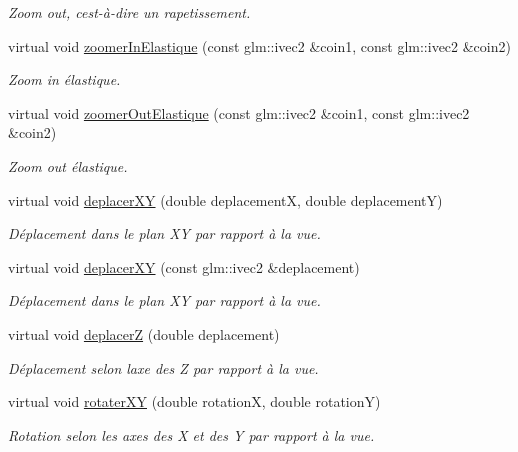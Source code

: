 \begin{DoxyCompactItemize}
\begin{DoxyCompactList}\small\item\em Zoom out, c\textquotesingle{}est-\/à-\/dire un rapetissement. \end{DoxyCompactList}\item 
virtual void \hyperlink{classvue_1_1_vue_ortho_aa8fb0de647e8c534986348f2bd5fe4a6}{zoomer\+In\+Elastique} (const glm\+::ivec2 \&coin1, const glm\+::ivec2 \&coin2)
\begin{DoxyCompactList}\small\item\em Zoom in élastique. \end{DoxyCompactList}\item 
virtual void \hyperlink{classvue_1_1_vue_ortho_afac237d33e78faa0a8c8aa7d146f2042}{zoomer\+Out\+Elastique} (const glm\+::ivec2 \&coin1, const glm\+::ivec2 \&coin2)
\begin{DoxyCompactList}\small\item\em Zoom out élastique. \end{DoxyCompactList}\item 
virtual void \hyperlink{classvue_1_1_vue_ortho_ad66a290e3d521fcc54ca2ef8a3dacf00}{deplacer\+X\+Y} (double deplacement\+X, double deplacement\+Y)
\begin{DoxyCompactList}\small\item\em Déplacement dans le plan X\+Y par rapport à la vue. \end{DoxyCompactList}\item 
virtual void \hyperlink{classvue_1_1_vue_ortho_a82253cbbf6e6d0c93e2e06f4a5459cba}{deplacer\+X\+Y} (const glm\+::ivec2 \&deplacement)
\begin{DoxyCompactList}\small\item\em Déplacement dans le plan X\+Y par rapport à la vue. \end{DoxyCompactList}\item 
virtual void \hyperlink{classvue_1_1_vue_ortho_a3a7d25b3aa2d785e03986ace12df8b99}{deplacer\+Z} (double deplacement)
\begin{DoxyCompactList}\small\item\em Déplacement selon l\textquotesingle{}axe des Z par rapport à la vue. \end{DoxyCompactList}\item 
virtual void \hyperlink{classvue_1_1_vue_ortho_a27fc207b65998727a27ebafecee03cb9}{rotater\+X\+Y} (double rotation\+X, double rotation\+Y)
\begin{DoxyCompactList}\small\item\em Rotation selon les axes des X et des Y par rapport à la vue. \end{DoxyCompactList}\item 

\end{DoxyCompactItemize}
